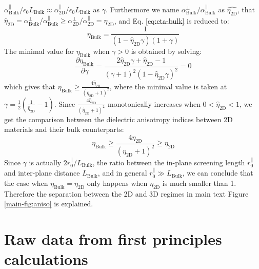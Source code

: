 \documentclass[journal=ancac3,email=true,hyperref=true,keywords=false]{achemso}
\begin{document}
$\alpha_{\mathrm{Bulk}}^{\parallel} /\epsilon_{0}L_{\mathrm{Bulk}}
\approx \alpha_{\mathrm{2D}}^{\parallel}/
\epsilon_{0}L_{\mathrm{Bulk}}$ as $\gamma$. Furthermore we name
$\alpha_{\mathrm{Bulk}}^{\perp}/\alpha_{\mathrm{Bulk}}^{\parallel}$ as
$\hat{\eta_{\mathrm{2D}}}$, that
$\hat{\eta}_{\mathrm{2D}} =
\alpha_{\mathrm{Bulk}}^{\perp}/\alpha_{\mathrm{Bulk}}^{\parallel} \geq
\alpha_{\mathrm{2D}}^{\perp}/\alpha_{\mathrm{2D}}^{\parallel}=\eta_{\mathrm{2D}}$,
and Eq. \ref{eq:eta-bulk} is reduced to:
\begin{equation}
  \label{eq:eta-bulk-2}
  \eta_{\mathrm{Bulk}} = \frac{1}{(1 - \hat{\eta}_{\mathrm{2D}} \gamma) (1 + \gamma)}
\end{equation}
The minimal value for $\eta_{\mathrm{Bulk}}$ when $\gamma>0$ is obtained by solving:
\begin{equation}
  \label{eq:eta-bulk-min}
  \frac{\partial \eta_{\mathrm{Bulk}}}{\partial \gamma}
  = \frac{2 \hat{\eta}_{\mathrm{2D}} \gamma + \hat{\eta}_{\mathrm{2D}} - 1}
  {(\gamma+1)^{2}(1 - \hat{\eta}_{\mathrm{2D}} \gamma)^{2}} = 0
\end{equation}
which gives that
$\eta_{\mathrm{Bulk}} \geq \frac{4
  \hat{\eta}_{\mathrm{2D}}}{(\hat{\eta}_{\mathrm{2D}} + 1)^{2}}$,
where the minimal value is taken at
$\gamma = \frac{1}{2}(\frac{1}{\hat{\eta}_{\mathrm{2D}}} - 1)$. Since
$\frac{4 \hat{\eta}_{\mathrm{2D}}}{(\hat{\eta}_{\mathrm{2D}} +
  1)^{2}}$ monotonically increases when
$0 < \hat{\eta}_{\mathrm{2D}} < 1$, we get the comparison between the
dielectric anisotropy indices between 2D materials and their bulk
counterparts:
\begin{equation}
  \label{eq:aniso-final}
\eta_{\mathrm{Bulk}} \geq \frac{4
  \eta_{\mathrm{2D}}}{(\eta_{\mathrm{2D}} + 1)^{2}} \geq
\eta_{\mathrm{2D}} 
\end{equation}
Since $\gamma$ is actually $2r_{0}^{\parallel}/L_{\mathrm{Bulk}}$, the
ratio between the in-plane screening length $r_{0}^{\parallel}$ and
inter-plane distance $L_{\mathrm{Bulk}}$, and in general
$r_{0}^{\parallel} \gg L_{\mathrm{Bulk}}$, we can conclude that the
case when $\eta_{\mathrm{Bulk}} = \eta_{\mathrm{2D}}$ only happens
when $\eta_{\mathrm{2D}}$ is much smaller than 1. Therefore the
separation between the 2D and 3D regimes in main text Figure
\ref{main-fig:aniso} is explained.







\section{Raw data from first principles calculations}
\label{sec:raw}
\end{document}
